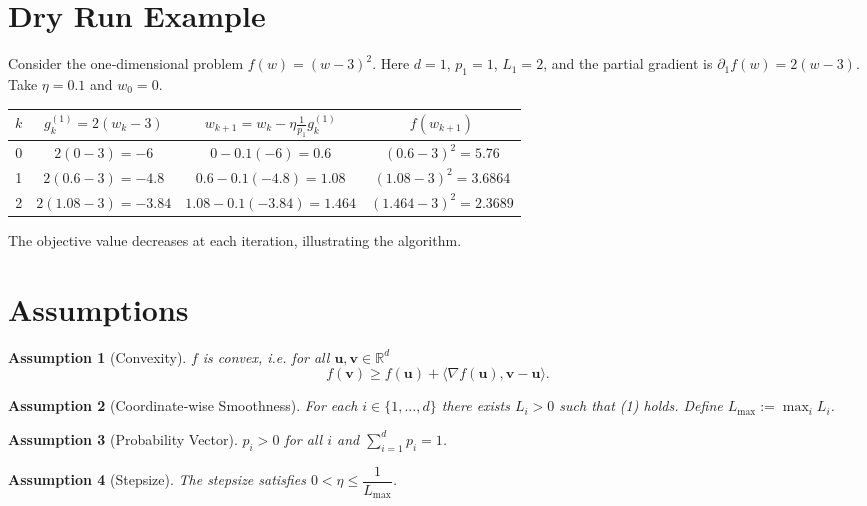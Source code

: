 \documentclass{article}
\newtheorem{assumption}{Assumption}
\newcommand{\R}{\mathbb{R}}
\newcommand{\ip}[2]{\langle #1,#2\rangle}
\newcommand{\grad}{\nabla}
\begin{document}
\section*{Dry Run Example}
Consider the one‑dimensional problem $f(w)=(w-3)^2$.
Here $d=1$, $p_1=1$, $L_1=2$, and the partial gradient is $\partial_1 f(w)=2(w-3)$.
Take $\eta=0.1$ and $w_0=0$.

\begin{center}
\begin{tabular}{c|c|c|c}
$k$ & $g_k^{(1)}=2(w_k-3)$ & $w_{k+1}=w_k-\eta\frac{1}{p_1}g_k^{(1)}$ & $f(w_{k+1})$\\\hline
0 & $2(0-3)=-6$ & $0-0.1(-6)=0.6$ & $(0.6-3)^2=5.76$\\
1 & $2(0.6-3)=-4.8$ & $0.6-0.1(-4.8)=1.08$ & $(1.08-3)^2=3.6864$\\
2 & $2(1.08-3)=-3.84$ & $1.08-0.1(-3.84)=1.464$ & $(1.464-3)^2=2.3689$\\
\end{tabular}
\end{center}
The objective value decreases at each iteration, illustrating the algorithm.

\newpage
\section*{Assumptions}
\begin{assumption}[Convexity]\label{as:conv}
$f$ is convex, i.e. for all $\mathbf{u},\mathbf{v}\in\R^{d}$
\[
f(\mathbf{v})\ge f(\mathbf{u})+\ip{\grad f(\mathbf{u})}{\mathbf{v}-\mathbf{u}} .
\tag{A1}
\]
\end{assumption}

\begin{assumption}[Coordinate‑wise Smoothness]\label{as:smooth}
For each $i\in\{1,\dots,d\}$ there exists $L_i>0$ such that (1) holds.
Define $L_{\max}:=\max_i L_i$.
\end{assumption}

\begin{assumption}[Probability Vector]\label{as:prob}
$p_i>0$ for all $i$ and $\sum_{i=1}^{d}p_i=1$.
\end{assumption}

\begin{assumption}[Stepsize]\label{as:step}
The stepsize satisfies $0<\eta\le \dfrac{1}{L_{\max}}$.
\end{assumption}
\end{document}
